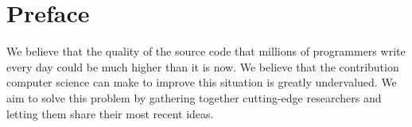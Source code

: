 \newpage
\section*{Preface}

We believe that the quality of the source code that millions of programmers
write every day could be much higher than it is now. We believe that the
contribution computer science can make to improve this situation is greatly
undervalued. We aim to solve this problem by gathering
together cutting-edge researchers and letting them share their most recent ideas.

